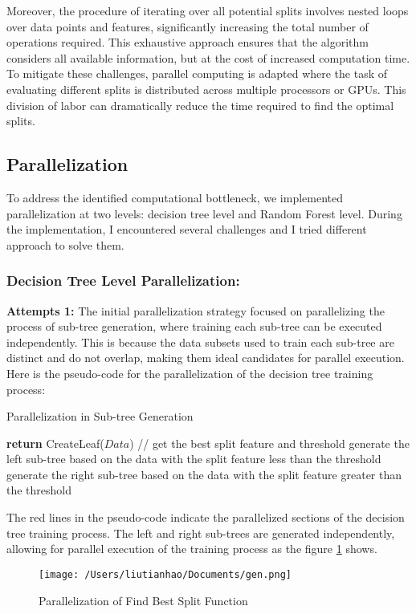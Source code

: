 \documentclass[13pt]{article}
\begin{document}
\newline
Moreover, the procedure of iterating over all potential splits involves nested loops over data points and features, significantly increasing the total number of operations required. This exhaustive approach ensures that the algorithm considers all available information, but at the cost of increased computation time. 
\newline
\newline
To mitigate these challenges, parallel computing is adapted where the task of evaluating different splits is distributed across multiple processors or GPUs. This division of labor can dramatically reduce the time required to find the optimal splits.



\subsection{Parallelization}
To address the identified computational bottleneck, we implemented parallelization at two levels: decision tree level and Random Forest level.
During the implementation, I encountered several challenges and I tried different approach to solve them.

\subsubsection{Decision Tree Level Parallelization:} 
    
\textbf{Attempts 1: }
The initial parallelization strategy focused on parallelizing the process of sub-tree generation, where training each sub-tree can be executed independently.
This is because the data subsets used to train each sub-tree are distinct and do not overlap, making them ideal candidates for parallel execution.
Here is the pseudo-code for the parallelization of the decision tree training process:
\begin{algorithm}[h!]
    \caption{Parallelization in Sub-tree Generation}\label{alg:gen}
    \begin{algorithmic}[1]
            \State \textbf{return} CreateLeaf($Data$)
        \EndIf
        \State // get the best split feature and threshold
        \State \color{red} generate the left sub-tree based on the data with the split feature less than the threshold \color{black}
        \State \color{red} generate the right sub-tree based on the data with the split feature greater than the threshold \color{black}
    \EndProcedure
    \end{algorithmic}
\end{algorithm}
The red lines in the pseudo-code indicate the parallelized sections of the decision tree training process. 
The left and right sub-trees are generated independently, allowing for parallel execution of the training process as the figure \ref{fig:gen} shows.
\begin{figure}[h!]
    \centering
    \texttt{[image: /Users/liutianhao/Documents/gen.png]}
    \caption{Parallelization of Find Best Split Function}
    \label{fig:gen}
\end{figure}
\end{document}
